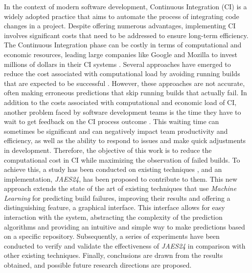 \vspace{1cm}

In the context of modern software development, Continuous Integration (CI) is a widely adopted
practice that aims to automate the process of integrating code changes in a project. Despite
offering numerous advantages, implementing CI involves significant costs that need to be addressed
to ensure long-term efficiency. The Continuous Integration phase can be costly in terms of
computational and economic resources, leading large companies like Google and Mozilla to invest
millions of dollars in their CI systems \cite{1}. Several approaches have emerged to reduce the
cost associated with computational load by avoiding running builds that are expected to be
successful \cite{2}. However, these approaches are not accurate, often making erroneous
predictions that skip running builds that actually fail. In addition to the costs associated with
computational and economic load of CI, another problem faced by software development teams is the
time they have to wait to get feedback on the CI process outcome \cite{3}. This waiting time can
sometimes be significant and can negatively impact team productivity and efficiency, as well as
the ability to respond to issues and make quick adjustments in development. Therefore, the
objective of this work is to reduce the computational cost in CI while maximizing the observation
of failed builds. To achieve this, a study has been conducted on existing techniques
\cite{2,4,5,6,7,8}, and an implementation, \textit{JAES24}, has been proposed to contribute to them.
This new approach extends the state of the art of existing techniques that use
\textit{Machine Learning} for predicting build failures, improving their results and offering a
distinguishing feature, a graphical interface. This interface allows for easy interaction with the
system, abstracting the complexity of the prediction algorithms and providing an intuitive and simple
way to make predictions based on a specific repository. Subsequently, a series of experiments have
been conducted to verify and validate the effectiveness of \textit{JAES24} in comparison with other
existing techniques. Finally, conclusions are drawn from the results obtained, and possible future
research directions are proposed.

\vspace{0.5cm}

\vfill

